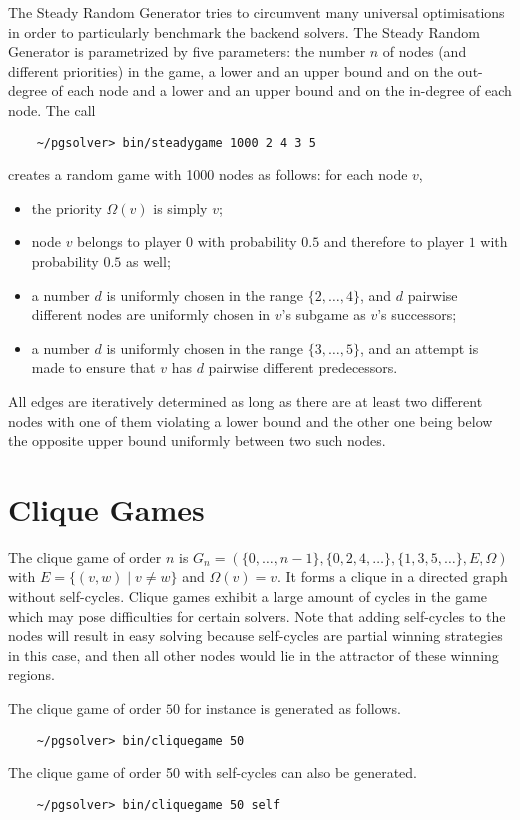 The Steady Random Generator tries to circumvent many universal optimisations in order to particularly
benchmark the backend solvers. The Steady Random Generator is parametrized by five parameters: the number
$n$ of nodes (and different priorities) in the game, a lower and an upper bound and on the
out-degree of each node and a lower and an upper bound and on the in-degree of each node. The call
\begin{verbatim}
    ~/pgsolver> bin/steadygame 1000 2 4 3 5
\end{verbatim}
creates a random game with 1000 nodes as follows: for each node $v$,
\begin{itemize}
\item the priority $\Omega(v)$ is simply $v$;
\item node $v$ belongs to player $0$ with probability $0.5$ and therefore to player $1$ with
      probability $0.5$ as well;
\item a number $d$ is uniformly chosen in the range $\{2,\ldots,4\}$, and $d$ pairwise different
      nodes are uniformly chosen in $v$'s subgame as $v$'s successors;
\item a number $d$ is uniformly chosen in the range $\{3,\ldots,5\}$, and an attempt is made to ensure
      that $v$ has $d$ pairwise different predecessors.
\end{itemize}
All edges are iteratively determined as long as there are at least two different nodes with one of them violating
a lower bound and the other one being below the opposite upper bound uniformly between two such nodes.


\section{Clique Games}

The clique game of order $n$ is $G_n = (\{0,\ldots,n-1\},\{0,2,4,\ldots\},\{1,3,5,\ldots\},E,\Omega)$
with $E = \{ (v,w) \mid v \ne w \}$ and $\Omega(v) = v$. It forms a clique in a directed graph without
self-cycles. Clique games exhibit a large amount of cycles in the game which may pose difficulties
for certain solvers. Note that adding self-cycles to the nodes will result in easy solving because
self-cycles are partial winning strategies in this case, and then all other nodes would lie in the attractor
of these winning regions.

The clique game of order $50$ for instance is generated as follows.
\begin{verbatim}
    ~/pgsolver> bin/cliquegame 50
\end{verbatim}
The clique game of order 50 with self-cycles can also be generated.
\begin{verbatim}
    ~/pgsolver> bin/cliquegame 50 self
\end{verbatim}


